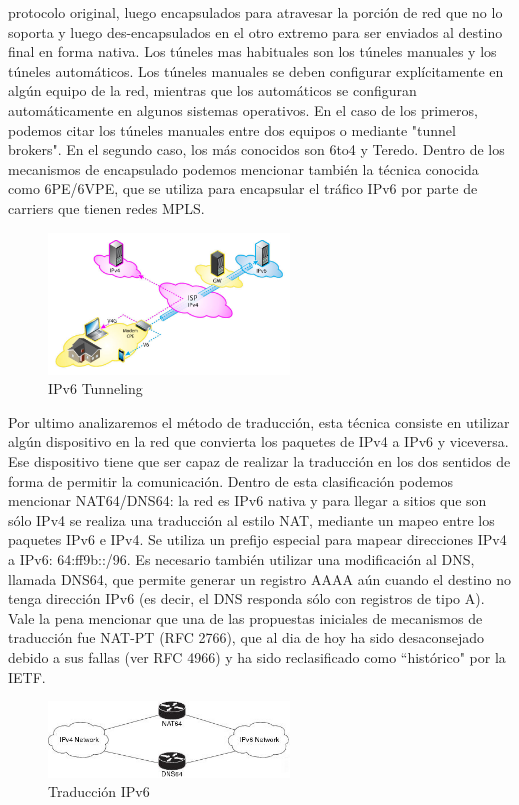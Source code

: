\documentclass[11pt,a4paper]{article}
\begin{document}
protocolo original, luego encapsulados para atravesar la porción de red que no lo soporta y luego 
des-encapsulados en el otro extremo para ser enviados al destino final en forma nativa.
Los túneles mas habituales son los túneles manuales y los túneles automáticos. Los túneles manuales 
se deben configurar explícitamente en algún equipo de la red, mientras que los automáticos se 
configuran automáticamente en algunos sistemas operativos. En el caso de los primeros, podemos citar 
los túneles manuales entre dos equipos o mediante "tunnel brokers". En el segundo caso, los más 
conocidos son 6to4 y Teredo.
Dentro de los mecanismos de encapsulado podemos mencionar también la técnica conocida como 6PE/6VPE, 
que se utiliza para encapsular el tráfico IPv6 por parte de carriers que tienen redes MPLS.
\begin{figure}[h!]
 \centering
 \includegraphics[width=0.57\textwidth]{ipv6_tunnel.jpg}
 \caption[IPv6 Tunneling]{IPv6 Tunneling}
\end{figure}\par
Por ultimo analizaremos el método de traducción, esta técnica consiste en utilizar algún dispositivo 
en la red que convierta los paquetes de IPv4 a IPv6 y viceversa. Ese dispositivo tiene que ser capaz 
de realizar la traducción en los dos sentidos de forma de permitir la comunicación. Dentro de esta 
clasificación podemos mencionar NAT64/DNS64: la red es IPv6 nativa y para llegar a sitios que son 
sólo IPv4 se realiza una traducción al estilo NAT, mediante un mapeo entre los paquetes IPv6 e IPv4. 
Se utiliza un prefijo especial para mapear direcciones IPv4 a IPv6: 64:ff9b::/96. Es necesario 
también utilizar una modificación al DNS, llamada DNS64, que permite generar un registro AAAA aún 
cuando el destino no tenga dirección IPv6 (es decir, el DNS responda sólo con registros de tipo A). 
Vale la pena mencionar que una de las propuestas iniciales de mecanismos de traducción fue NAT-PT 
(RFC 2766), que al dia de hoy ha sido desaconsejado debido a sus fallas (ver RFC 4966) y ha sido 
reclasificado como ``histórico" por la IETF.
\begin{figure}[h!]
 \centering
 \includegraphics[width=0.57\textwidth]{ipv6_translation.jpg}
 \caption[Traducción IPv6]{Traducción IPv6}
\end{figure}
\end{document}
